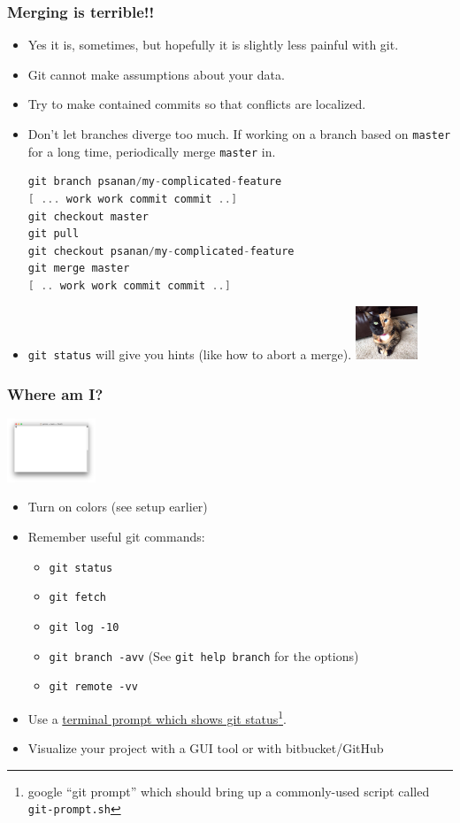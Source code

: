 \documentclass{beamer}
\begin{document}
\begin{frame}[fragile]
\frametitle{Merging is terrible!!}
\begin{itemize}
\item Yes it is, sometimes, but hopefully it is slightly less painful with git.
\item Git cannot make assumptions about your data.
\item Try to make contained commits so that conflicts are localized.
\item Don't let branches diverge too much. If working on a branch based on \texttt{master} for a long time, periodically merge \texttt{master} in.
\begin{lstlisting}[language=C++]
git branch psanan/my-complicated-feature
[ ... work work commit commit ..]
git checkout master
git pull
git checkout psanan/my-complicated-feature
git merge master
[ .. work work commit commit ..]
\end{lstlisting}
\item \lstinline{git status} will give you hints (like how to abort a merge).
\includegraphics[width=70px]{chimera.jpg}
\end{itemize}
\end{frame}

\begin{frame}[fragile]
\frametitle{Where am I?}
\includegraphics[width=100px]{term}
\begin{itemize}
\item Turn on colors (see setup earlier)
\item 
Remember useful git commands:
\begin{itemize}
\item \lstinline{git status}
\item \lstinline{git fetch}
\item \lstinline{git log -10}
\item \lstinline{git branch -avv} (See \lstinline{git help branch} for the options)
\item \lstinline{git remote -vv}
\end{itemize}
\item Use a \href{https://raw.githubusercontent.com/git/git/master/contrib/completion/git-prompt.sh}{terminal prompt which shows git status}\footnote{google ``git prompt'' which should bring up a commonly-used script called \texttt{git-prompt.sh}}.
\item Visualize your project with a GUI tool or with bitbucket/GitHub
\end{itemize}
\end{frame}
\end{document}
